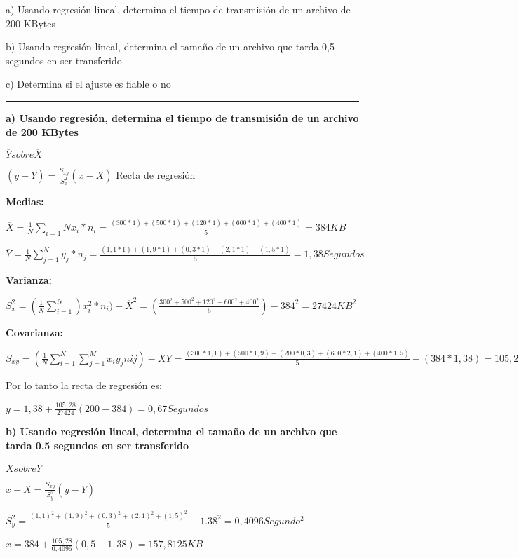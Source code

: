 \documentclass{article}
\begin{document}
a) Usando regresi\'on lineal, determina el tiempo de transmisi\'on de un archivo de 200 KBytes

b) Usando regresi\'on lineal, determina el tamaño de un archivo que tarda 0,5 segundos en ser transferido

c) Determina si el ajuste es fiable o no

\rule{119mm}{0.2mm}

\textbf{a) Usando regresi\'on, determina el tiempo de transmisi\'on de un archivo de 200 KBytes}

\(\overline{Y} sobre \overline{X} \) 

\( (y - \overline{Y}) = \frac{S_{xy}}{S_{x}^2} (x - \overline{X})\) Recta de regresi\'on

\textbf{Medias:} 

\(\overline{X} = \frac{1}{N} \displaystyle\sum_{i=1}{N} x_{i} * n_{i} = \frac{(300 * 1) + (500 * 1) + (120 * 1) +(600 * 1) + (400 * 1)}{5} = 384KB\)

\(\overline{Y} = \frac{1}{N} \displaystyle\sum_{j=1}^{N} y_{j} * n_{j} = \frac{(1,1 * 1) + (1,9 * 1) + (0,3 * 1) +(2,1 * 1) + (1,5 * 1)}{5} = 1,38 Segundos\)

\textbf{Varianza:} 

\(S_{x}^2 = (\frac{1}{N} \displaystyle\sum_{i = 1}^{N}) x_{i}^2 * n_{i}) - \overline{X}^2 = (\frac{300^2 + 500^2 + 120^2 + 600^2 + 400^2}{5}) - 384^2 = 27424 KB^2 \)

\textbf{Covarianza:}

\( S_{xy} = (\frac{1}{N} \displaystyle\sum_{i=1}^{N} \displaystyle\sum_{j=1}^{M} x_{i} y_{j} n{ij})  - \overline{X}\overline{Y} = \frac{(300 * 1,1) + (500 * 1,9) + (200 * 0,3) + (600 * 2,1) + (400 * 1,5)}{5} - (384 * 1,38) = 105,28 KBSegundo \)

Por lo tanto la recta de regresi\'on es:

\(y = 1,38 + \frac{105,28}{27424} (200 - 384) = 0,67 Segundos\)

\textbf{b) Usando regresi\'on lineal, determina el tamaño de un archivo que tarda 0.5 segundos en ser transferido}

\(\overline{X} sobre \overline{Y}\)

\(x - \overline{X} = \frac{S_{xy}}{S_{y}^2} (y - \overline{Y})\)

\(S_{y}^2 = \frac{(1,1)^2 + (1,9)^2 + (0,3)^2 + (2,1)^2 + (1,5)^2} {5} - 1.38^2 = 0,4096 Segundo^2\)

\(x = 384 + \frac{105,28}{0,4096} (0,5 - 1,38) = 157,8125KB\)
\end{document}
